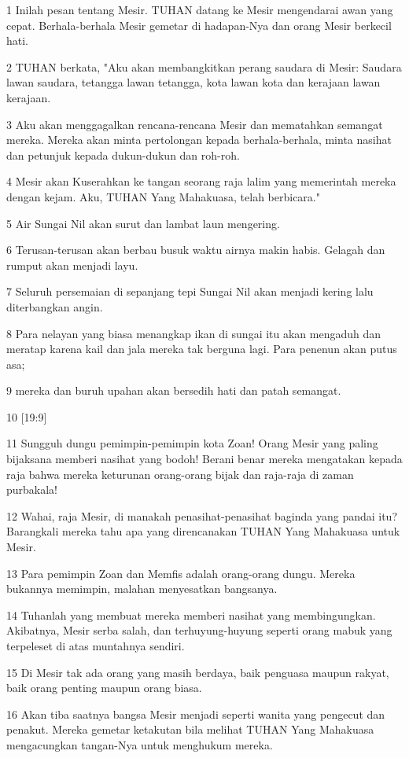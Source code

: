 \par 1 Inilah pesan tentang Mesir. TUHAN datang ke Mesir mengendarai awan yang cepat. Berhala-berhala Mesir gemetar di hadapan-Nya dan orang Mesir berkecil hati.
\par 2 TUHAN berkata, "Aku akan membangkitkan perang saudara di Mesir: Saudara lawan saudara, tetangga lawan tetangga, kota lawan kota dan kerajaan lawan kerajaan.
\par 3 Aku akan menggagalkan rencana-rencana Mesir dan mematahkan semangat mereka. Mereka akan minta pertolongan kepada berhala-berhala, minta nasihat dan petunjuk kepada dukun-dukun dan roh-roh.
\par 4 Mesir akan Kuserahkan ke tangan seorang raja lalim yang memerintah mereka dengan kejam. Aku, TUHAN Yang Mahakuasa, telah berbicara."
\par 5 Air Sungai Nil akan surut dan lambat laun mengering.
\par 6 Terusan-terusan akan berbau busuk waktu airnya makin habis. Gelagah dan rumput akan menjadi layu.
\par 7 Seluruh persemaian di sepanjang tepi Sungai Nil akan menjadi kering lalu diterbangkan angin.
\par 8 Para nelayan yang biasa menangkap ikan di sungai itu akan mengaduh dan meratap karena kail dan jala mereka tak berguna lagi. Para penenun akan putus asa;
\par 9 mereka dan buruh upahan akan bersedih hati dan patah semangat.
\par 10 [19:9]
\par 11 Sungguh dungu pemimpin-pemimpin kota Zoan! Orang Mesir yang paling bijaksana memberi nasihat yang bodoh! Berani benar mereka mengatakan kepada raja bahwa mereka keturunan orang-orang bijak dan raja-raja di zaman purbakala!
\par 12 Wahai, raja Mesir, di manakah penasihat-penasihat baginda yang pandai itu? Barangkali mereka tahu apa yang direncanakan TUHAN Yang Mahakuasa untuk Mesir.
\par 13 Para pemimpin Zoan dan Memfis adalah orang-orang dungu. Mereka bukannya memimpin, malahan menyesatkan bangsanya.
\par 14 Tuhanlah yang membuat mereka memberi nasihat yang membingungkan. Akibatnya, Mesir serba salah, dan terhuyung-huyung seperti orang mabuk yang terpeleset di atas muntahnya sendiri.
\par 15 Di Mesir tak ada orang yang masih berdaya, baik penguasa maupun rakyat, baik orang penting maupun orang biasa.
\par 16 Akan tiba saatnya bangsa Mesir menjadi seperti wanita yang pengecut dan penakut. Mereka gemetar ketakutan bila melihat TUHAN Yang Mahakuasa mengacungkan tangan-Nya untuk menghukum mereka.
